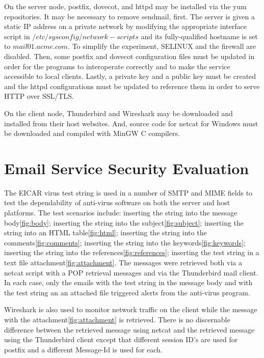 \documentclass[10pt,conference]{IEEEtran}
\begin{document}
On the server node, postfix, dovecot, and httpd may be installed via the yum repositories. It may
be necessary to remove sendmail, first. The server is given a static IP address on a private network
by modifying the appropriate interface script in $/etc/sysconfig/network-scripts$ and its fully-qualified
hostname is set to $mail01.acme.com$. To simplify the experiment, SELINUX and the firewall are 
disabled. Then, some postfix and dovecot configuration files must be updated\cite{centos:email:sk} 
in order for the programs to interoperate correctly and to make the service accessible to local clients.
Lastly, a private key and a public key must be created and the httpd configurations must be updated to 
reference them in order to serve HTTP over SSL/TLS\cite{centos:http:cg}.

On the client node, Thunderbird\cite{windows:thunderbird} and Wireshark\cite{windows:wireshark} may
be downloaded and installed from their host websites.
And, source code for netcat for Windows\cite{windows:netcat:jc} must be downloaded and compiled
with MinGW\cite{windows:mingw} C compilers.

\section{Email Service Security Evaluation}
The EICAR virus\cite{windows:eicar} test string is used in a number of SMTP
and MIME fields to test the dependability of anti-virus software on both the server and host platforms.
The test scenarios include: inserting the string into the message body\ref{fig:body}; inserting the string into the subject\ref{fig:subject};
inserting the string into an HTML table\ref{fig:html}; inserting the string into the comments\ref{fig:comments};  inserting the string into the
keywords\ref{fig:keywords}; inserting the string into the references\ref{fig:references}; inserting the test string in a text file attachment\ref{fig:attachment}.
The messages were retrieved both via a netcat script with a POP retrieval messages and via the Thunderbird mail client.
In each case, only the emails with the test string in the message body and with the test string an an attached file triggered
alerts from the anti-virus program.

Wireshark is also used to monitor network traffic on the client while the message with the attachment\ref{fig:attachment} is retrieved. There is no discernable
difference between the retrieved message using netcat and the retrieved message using the Thunderbird client except that different session ID's 
are used for postfix and a different Message-Id is used for each.
\end{document}
